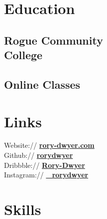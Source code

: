 \documentclass[]{deedy-resume-openfont}
\begin{document}
%
%

%
%

\begin{minipage}[t]{0.26\textwidth} 


\section{Education} 

\subsection{Rogue Community \\ College}
\sectionsep

\subsection{Online Classes}
\sectionsep



\section{Links} 
Website:// \href{https://rory-dwyer.com}{\bf rory-dwyer.com} \\
Github:// \href{https://github.com/rorydwyer}{\bf rorydwyer} \\
Dribbble://  \href{https://dribbble.com/Rory-Dwyer}{\bf Rory-Dwyer} \\
Instagram://  \href{https://www.instagram.com/_rorydwyer/}{\bf \_rorydwyer}
\sectionsep



\section{Skills}

\end{minipage}
\end{document}
